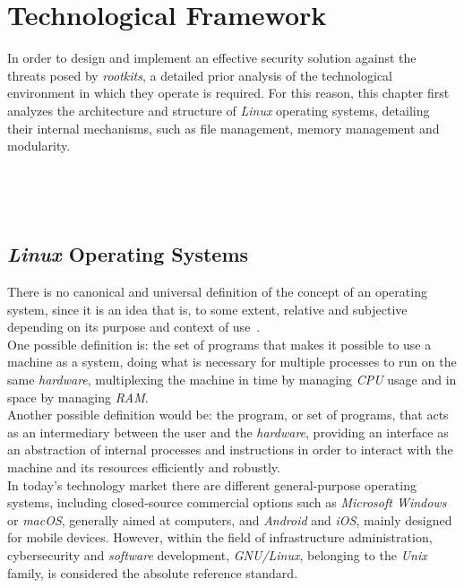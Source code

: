 \chapter{Technological Framework}
\label{cap:capitulo2}

In order to design and implement an effective security solution against the threats posed by \textit{rootkits}, a detailed prior analysis of the technological environment in which they operate is required.
For this reason, this chapter first analyzes the architecture and structure of \textit{Linux} operating systems, detailing their internal mechanisms, such as file management, memory management and modularity.

\

\

\section{\textit{Linux} Operating Systems}
\label{sec:linux}

There is no canonical and universal definition of the concept of an operating system, since it is an idea that is, to some extent, relative and subjective depending on its purpose and context of use~\cite{librossoo}.\\

One possible definition is: the set of programs that makes it possible to use a machine as a system, doing what is necessary for multiple processes to run on the same \textit{hardware}, multiplexing the machine in time by managing \textit{CPU} usage and in space by managing \textit{RAM}.\\

Another possible definition would be: the program, or set of programs, that acts as an intermediary between the user and the \textit{hardware}, providing an interface as an abstraction of internal processes and instructions in order to interact with the machine and its resources efficiently and robustly.\\

In today's technology market there are different general-purpose operating systems, including closed-source commercial options such as \textit{Microsoft Windows} or \textit{macOS}, generally aimed at computers, and \textit{Android} and \textit{iOS}, mainly designed for mobile devices. However, within the field of infrastructure administration, cybersecurity and \textit{software} development, \textit{GNU/Linux}, belonging to the \textit{Unix} family, is considered the absolute reference standard.\\

